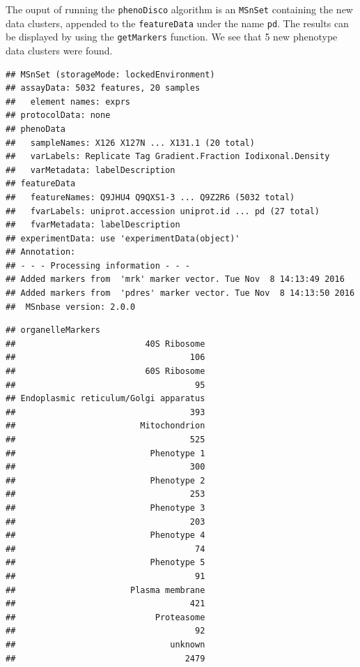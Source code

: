 The ouput of running the \texttt{phenoDisco} algorithm is an
\texttt{MSnSet} containing the new data clusters, appended to the
\texttt{featureData} under the name \texttt{pd}. The results can be
displayed by using the \texttt{getMarkers} function. We see that 5 new
phenotype data clusters were found.

\begin{knitrout}
\color{fgcolor}\begin{kframe}
\begin{alltt}
\end{alltt}
\begin{verbatim}
## MSnSet (storageMode: lockedEnvironment)
## assayData: 5032 features, 20 samples 
##   element names: exprs 
## protocolData: none
## phenoData
##   sampleNames: X126 X127N ... X131.1 (20 total)
##   varLabels: Replicate Tag Gradient.Fraction Iodixonal.Density
##   varMetadata: labelDescription
## featureData
##   featureNames: Q9JHU4 Q9QXS1-3 ... Q9Z2R6 (5032 total)
##   fvarLabels: uniprot.accession uniprot.id ... pd (27 total)
##   fvarMetadata: labelDescription
## experimentData: use 'experimentData(object)'
## Annotation:  
## - - - Processing information - - -
## Added markers from  'mrk' marker vector. Tue Nov  8 14:13:49 2016 
## Added markers from  'pdres' marker vector. Tue Nov  8 14:13:50 2016 
##  MSnbase version: 2.0.0
\end{verbatim}
\begin{alltt}
  \hlstd{=} \hlstd{)}
\end{alltt}
\begin{verbatim}
## organelleMarkers
##                          40S Ribosome 
##                                   106 
##                          60S Ribosome 
##                                    95 
## Endoplasmic reticulum/Golgi apparatus 
##                                   393 
##                         Mitochondrion 
##                                   525 
##                           Phenotype 1 
##                                   300 
##                           Phenotype 2 
##                                   253 
##                           Phenotype 3 
##                                   203 
##                           Phenotype 4 
##                                    74 
##                           Phenotype 5 
##                                    91 
##                       Plasma membrane 
##                                   421 
##                            Proteasome 
##                                    92 
##                               unknown 
##                                  2479
\end{verbatim}
\end{kframe}
\end{knitrout}


